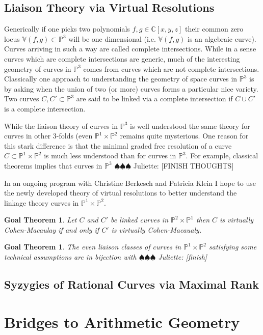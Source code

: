 \documentclass[10pt,reqno]{amsart}
\newtheorem{goalTheorem}[lemma]{Goal Theorem}
\theoremstyle{remark}
\newcommand{\C}{\mathbb{C}}
\renewcommand{\P}{\mathbb{P}}
\newcommand{\V}{\mathbb{V}}
\newcommand{\juliette}[1]{{\color{red} \sf $\spadesuit\spadesuit\spadesuit$ Juliette: [#1]}}
\begin{document}
\subsection{Liaison Theory via Virtual Resolutions}

Generically if one picks two polynomials $f,g\in \C[x,y,z]$ their common zero locus $\V(f,g)\subset \P^3$ will be one dimensional (i.e. $\V(f,g)$ is an algebraic curve). Curves arriving in such a way are called complete intersections. While in a sense curves which are complete intersections are generic, much of the interesting geometry of curves in $\P^3$ comes from curves which are not complete intersections. Classically one approach to understanding the geometry of space curves in $\P^3$ is by asking when the union of two (or more) curves forms a particular nice variety. Two curves $C,C'\subset \P^3$ are said to be linked via a complete intersection if $C\cup C'$ is a complete intersection.

While the liaison theory of curves in $\P^3$ is well understood the same theory for curves in other 3-folds (even $\P^1\times\P^2$ remains quite mysterious. One reason for this stark difference is that the minimal graded free resolution of a curve $C\subset \P^1\times\P^2$ is much less understood than for curves in $\P^3$. For example, classical theorems implies that curves in $\P^3$  \juliette{FINISH THOUGHTS}

In an ongoing program with Christine Berkesch and Patricia Klein I hope to use the newly developed theory of virtual resolutions to better understand the linkage theory curves in $\P^1\times\P^2$. 

\begin{goalTheorem}
Let $C$ and $C'$ be linked curves in $\P^2\times\P^1$ then $C$ is virtually Cohen-Macaulay if and only if $C'$ is virtually Cohen-Macaualy.
\end{goalTheorem}

\begin{goalTheorem}
The even liaison classes of curves in $\P^1\times\P^2$ satisfying some technical assumptions are in bijection with \juliette{finish}
\end{goalTheorem}

\subsection{Syzygies of Rational Curves via Maximal Rank}




\section{Bridges to Arithmetic Geometry}
\end{document}
